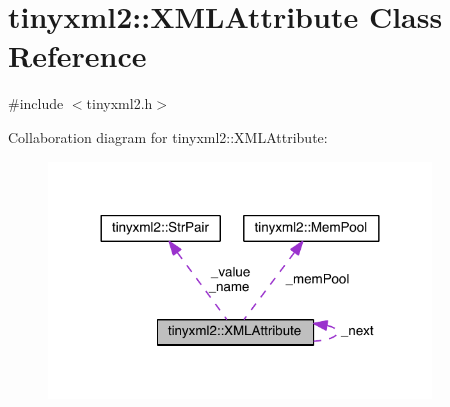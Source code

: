 \hypertarget{classtinyxml2_1_1_x_m_l_attribute}{}\section{tinyxml2\+:\+:X\+M\+L\+Attribute Class Reference}
\label{classtinyxml2_1_1_x_m_l_attribute}


{\ttfamily \#include $<$tinyxml2.\+h$>$}



Collaboration diagram for tinyxml2\+:\+:X\+M\+L\+Attribute\+:\nopagebreak
\begin{figure}[H]
\begin{center}
\leavevmode
\includegraphics[width=288pt]{classtinyxml2_1_1_x_m_l_attribute__coll__graph}
\end{center}
\end{figure}
